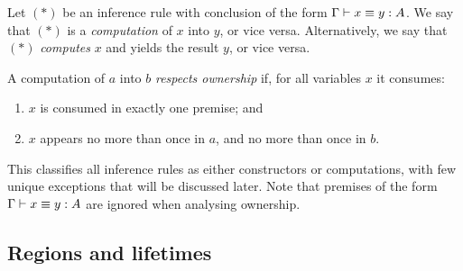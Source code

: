 \documentclass[UKenglish, 11pt, a4paper, parskip=half]{scrbook}
\begin{document}
\begin{defn}
  Let \((\ast)\) be an inference rule with conclusion of the form \( \Gamma \vdash x \equiv y : A \).
  We say that \((\ast)\) is a \textit{computation} of \( x \) into \( y \), or vice versa.
  Alternatively, we say that \((\ast)\) \textit{computes} \( x \) and yields the result \( y \), or vice versa.
\end{defn}
\begin{defn}
  A computation of \( a \) into \( b \) \textit{respects ownership} if, for all variables \( x \) it consumes:
  \begin{enumerate}
    \item \( x \) is consumed in exactly one premise; and
    \item \( x \) appears no more than once in \( a \), and no more than once in \( b \).
  \end{enumerate}
\end{defn}
This classifies all inference rules as either constructors or computations, with few unique exceptions that will be discussed later.
Note that premises of the form \( \Gamma \vdash x \equiv y : A \) are ignored when analysing ownership.

\subsection{Regions and lifetimes}
\end{document}
